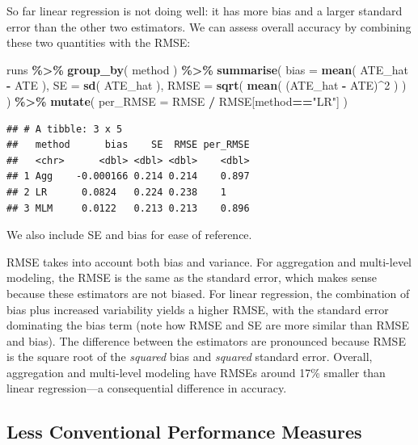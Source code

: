 \documentclass[
]{book}
\newenvironment{Shaded}{\begin{snugshade}}{\end{snugshade}}
\newcommand{\AttributeTok}[1]{\textcolor[rgb]{0.13,0.29,0.53}{#1}}
\newcommand{\DecValTok}[1]{\textcolor[rgb]{0.00,0.00,0.81}{#1}}
\newcommand{\FunctionTok}[1]{\textcolor[rgb]{0.13,0.29,0.53}{\textbf{#1}}}
\newcommand{\NormalTok}[1]{#1}
\newcommand{\SpecialCharTok}[1]{\textcolor[rgb]{0.81,0.36,0.00}{\textbf{#1}}}
\newcommand{\StringTok}[1]{\textcolor[rgb]{0.31,0.60,0.02}{#1}}
\begin{document}
So far linear regression is not doing well: it has more bias and a larger standard error than the other two estimators.
We can assess overall accuracy by combining these two quantities with the RMSE:

\begin{Shaded}
\begin{Highlighting}[]
\NormalTok{runs }\SpecialCharTok{\%\textgreater{}\%} 
  \FunctionTok{group\_by}\NormalTok{( method ) }\SpecialCharTok{\%\textgreater{}\%}
  \FunctionTok{summarise}\NormalTok{( }
    \AttributeTok{bias =} \FunctionTok{mean}\NormalTok{( ATE\_hat }\SpecialCharTok{{-}}\NormalTok{ ATE ),}
    \AttributeTok{SE =} \FunctionTok{sd}\NormalTok{( ATE\_hat ),}
    \AttributeTok{RMSE =} \FunctionTok{sqrt}\NormalTok{( }\FunctionTok{mean}\NormalTok{( (ATE\_hat }\SpecialCharTok{{-}}\NormalTok{ ATE)}\SpecialCharTok{\^{}}\DecValTok{2}\NormalTok{ ) )}
\NormalTok{  ) }\SpecialCharTok{\%\textgreater{}\%}
  \FunctionTok{mutate}\NormalTok{( }
    \AttributeTok{per\_RMSE =}\NormalTok{ RMSE }\SpecialCharTok{/}\NormalTok{ RMSE[method}\SpecialCharTok{==}\StringTok{"LR"}\NormalTok{]}
\NormalTok{  )}
\end{Highlighting}
\end{Shaded}

\begin{verbatim}
## # A tibble: 3 x 5
##   method      bias    SE  RMSE per_RMSE
##   <chr>      <dbl> <dbl> <dbl>    <dbl>
## 1 Agg    -0.000166 0.214 0.214    0.897
## 2 LR      0.0824   0.224 0.238    1    
## 3 MLM     0.0122   0.213 0.213    0.896
\end{verbatim}

We also include SE and bias for ease of reference.

RMSE takes into account both bias and variance.
For aggregation and multi-level modeling, the RMSE is the same as the standard error, which makes sense because these estimators are not biased.
For linear regression, the combination of bias plus increased variability yields a higher RMSE, with the standard error dominating the bias term (note how RMSE and SE are more similar than RMSE and bias).
The difference between the estimators are pronounced because RMSE is the square root of the \emph{squared} bias and \emph{squared} standard error.
Overall, aggregation and multi-level modeling have RMSEs around 17\% smaller than linear regression---a consequential difference in accuracy.

\subsection{Less Conventional Performance Measures}\label{less-conventional-measures}
\end{document}
